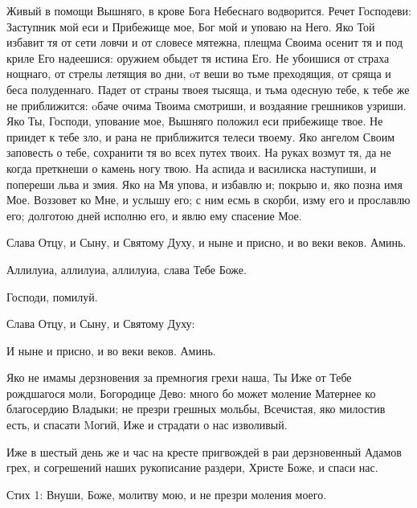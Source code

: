 \begin{mymulticols}


Живый в помощи Вышняго, в крове Бога Небеснаго водворится. Речет Господеви: Заступник мой еси и Прибежище мое, Бог мой и уповаю на Него. Яко Той избавит тя от сети ловчи и от словесе мятежна, плещма Своима осенит тя и под криле Его надеешися: оружием обыдет тя истина Его. Не убоишися от страха нощнаго, от стрелы летящия во дни, oт веши во тьме преходящия, от сряща и беса полуденнаго. Падет от страны твоея тысяща, и тьма одесную тебе, к тебе же не приближится: oбаче очима Твоима смотриши, и воздаяние грешников узриши. Яко Ты, Господи, упование мое, Вышняго положил еси прибежище твое. Не приидет к тебе зло, и рана не приближится телеси твоему. Яко ангелом Своим заповесть о тебе, сохранити тя во всех путех твоих. На руках возмут тя, да не когда преткнеши о камень ногу твою. На аспида и василиска наступиши, и попереши льва и змия. Яко на Мя упова, и избавлю и; покрыю и, яко позна имя Мое. Воззовет ко Мне, и услышу его; с ним есмь в скорби, изму его и прославлю его; долготою дней исполню его, и явлю ему спасение Мое.



Слава Отцу, и Сыну, и Святому Духу, и ныне и присно, и во веки веков. Аминь.

Аллилуиа, аллилуиа, аллилуиа, слава Тебе Боже.

Господи, помилуй.

Слава Отцу, и Сыну, и Святому Духу:





И ныне и присно, и во веки веков. Аминь.

 Яко не имамы дерзновения за премногия грехи наша, Ты Иже от Тебе рождшагося моли, Богородице Дево: много бо может моление Матернее ко благосердию Владыки; не презри грешных мольбы, Всечистая, яко милостив есть, и спасати Mогий, Иже и страдати о нас изволивый.



\myemph{ [Если Великий пост "--- настоящий тропарь, глас 2:}

Иже в шестый день же и час на кресте пригвождей в раи дерзновенный Адамов грех, и согрешений наших рукописание раздери, Христе Боже, и спаси нас.




Стих 1: Внуши, Боже, молитву мою, и не презри моления моего.





\end{mymulticols}
